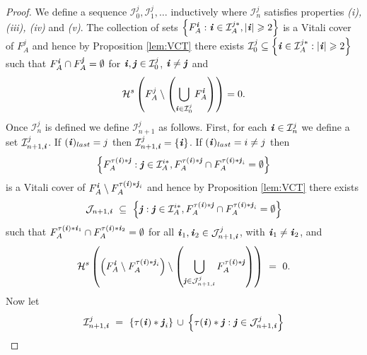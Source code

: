 \documentclass[11pt,english,british]{article}
\numberwithin{equation}{section}
\renewcommand{\geq}{\geqslant}
\begin{document}
\begin{proof}
We define a sequence $\mathcal{I}_{0}^{j},\mathcal{I}_{1}^{j},\ldots$
inductively where $\mathcal{I}_{n}^{j}$ satisfies properties \textit{(i),
(iii), (iv)} and \textit{(v)}. The collection of sets $\left\{ F_{A}^{\textbf{\emph{i}}}:\textbf{\emph{i}}\in\mathcal{I}_{A}^{j*},\left|\textbf{\emph{i}}\right|\geq2\right\} $
is a Vitali cover of $F_{A}^{j}$ and hence by Proposition \ref{lem:VCT}
there exists $\mathcal{I}_{0}^{j}\subseteq\left\{ \textbf{\emph{i}}\in\mathcal{I}_{A}^{j*}:\left|\textbf{\emph{i}}\right|\geq2\right\} $
 such that $F_{A}^{\textbf{\emph{i}}}\cap F_{A}^{\textbf{\emph{j}}}=\emptyset$
for $\textbf{\emph{i}},\textbf{\emph{j}}\in\mathcal{I}_{0}^{j}$,
$\textbf{\emph{i}}\neq\textbf{\emph{j}}$ and 
\[
\mathcal{H}^{s}\left(F_{A}^{j}\setminus\left(\bigcup_{\textbf{\emph{i}}\in\mathcal{I}_{0}^{j}}F_{A}^{\textbf{\emph{i}}}\right)\right)=0.
\]
Once $\mathcal{I}_{n}^{j}$ is defined we define $\mathcal{I}_{n+1}^{j}$
as follows. First, for each $\textbf{\emph{i}}\in\mathcal{I}_{n}^{j}$
we define a set $\mathcal{I}_{n+1,\textbf{\emph{i}}}^{j}$.
If $(\textbf{\emph{i}})_{last}=j$ then $\mathcal{I}_{n+1,\textbf{\emph{i}}}^{j}=\left\{ \textbf{\emph{i}}\right\} $.
If $(\textbf{\emph{i}})_{last}=i\neq j$
then
\[
\left\{ F_{A}^{\tau(\textbf{\emph{i}})*\textbf{\emph{j}}}:\textbf{\emph{j}}\in\mathcal{I}_{A}^{i*},F_{A}^{\tau(\textbf{\emph{i}})*\textbf{\emph{j}}}\cap F_{A}^{\tau(\textbf{\emph{i}})*\textbf{\emph{j}}_{i}}=\emptyset\right\}
\]
is a Vitali cover of $F_{A}^{\textbf{\emph{i}}}\setminus F_{A}^{\tau(\textbf{\emph{i}})*\textbf{\emph{j}}_{i}}$ and
hence by Proposition \ref{lem:VCT} there exists 
\[
\mathcal{J}_{n+1,\textbf{\emph{i}}} \ \subseteq \ \left\{ \textbf{\emph{j}}:\textbf{\emph{j}}\in\mathcal{I}_{A}^{i*},F_{A}^{\tau(\textbf{\emph{i}})*\textbf{\emph{j}}}\cap F_{A}^{\tau(\textbf{\emph{i}})*\textbf{\emph{j}}_{i}}=\emptyset\right\}
\]
such that $F_{A}^{\tau(\textbf{\emph{i}})*\textbf{\emph{i}}_{1}}\cap F_{A}^{\tau(\textbf{\emph{i}})*\textbf{\emph{i}}_{2}}=\emptyset$
for all $\textbf{\emph{i}}_{1},\textbf{\emph{i}}_{2}\in\mathcal{J}_{n+1,\textbf{\emph{i}}}^{j}$, with 
$\textbf{\emph{i}}_{1}\neq\textbf{\emph{i}}_{2}$, and
\[
\mathcal{H}^{s}\left(\left(F_{A}^{\textbf{\emph{i}}}\setminus F_{A}^{\tau(\textbf{\emph{i}})*\textbf{\emph{j}}_{i}}\right)\setminus\left(\bigcup_{\textbf{\emph{j}}\in\mathcal{J}_{n+1,\textbf{\emph{i}}}^{j}}F_{A}^{\tau(\textbf{\emph{i}})*\textbf{\emph{j}}}\right)\right) \ = \ 0.
\]
Now let
\[
\mathcal{I}_{n+1,\textbf{\emph{i}}}^{j} \ = \ \left\{ \tau(\textbf{\emph{i}})*\textbf{\emph{j}}_{i}\right\} \, \cup \, \left\{ \tau(\textbf{\emph{i}})*\textbf{\emph{j}}:\textbf{\emph{j}}\in\mathcal{J}_{n+1,\textbf{\emph{i}}}^{j}\right\}
\]
\end{proof}
\end{document}
